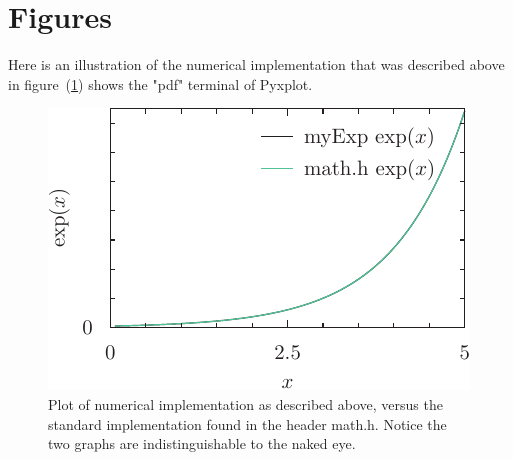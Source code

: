 \documentclass[twocolumn]{article}
\begin{document}
\section{Figures}
Here is an illustration of the numerical implementation that was described above in figure~(\ref{fig:pyxplot})
shows the "pdf" terminal of Pyxplot.


\begin{figure}[h]
	\includegraphics{myExpFunc-fig-pyxplot.pdf}
	\caption{ Plot of numerical implementation as described above, versus the standard implementation found in the header math.h. Notice the two graphs are indistinguishable to the naked eye.}
	\label{fig:pyxplot}
\end{figure}
\end{document}
